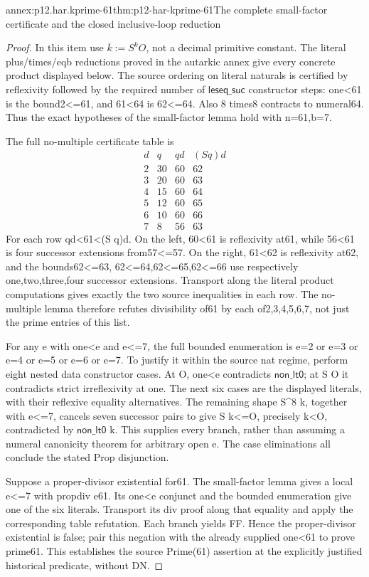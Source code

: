 \begin{annexitem}{annex:p12.har.kprime-61}{thm:p12-har-kprime-61}{The complete small-factor certificate and the closed inclusive-loop reduction}
\begin{proof}
In this item use \(\overline{k}:=S^kO\), not a decimal primitive
constant. The literal plus/times/eqb reductions proved in the autarkic
annex give every concrete product displayed below. The source ordering
on literal naturals is certified by reflexivity followed by the required
number of \(\mathsf{leseq\_suc}\) constructor steps: one<61 is the bound2<=61,
and 61<64 is 62<=64. Also 8 times8 contracts to numeral64.
Thus the exact hypotheses of the small-factor lemma hold with n=61,b=7.

The full no-multiple certificate table is
\[
\begin{array}{c|c|c|c}
 d&q&qd& (S q)d\\\hline
 2&30&60&62\\
 3&20&60&63\\
 4&15&60&64\\
 5&12&60&65\\
 6&10&60&66\\
 7&8&56&63
\end{array}
\]
For each row qd<61<(S q)d. On the left, 60<61 is reflexivity
at61, while 56<61 is four successor extensions from57<=57.
On the right, 61<62 is reflexivity at62, and the bounds62<=63,
62<=64,62<=65,62<=66 use respectively one,two,three,four successor
extensions. Transport along the literal product computations gives
exactly the two source inequalities in each row. The no-multiple
lemma therefore refutes divisibility of61 by each of2,3,4,5,6,7,
not just the prime entries of this list.

For any e with one<e and e<=7, the full bounded enumeration is
e=2 or e=3 or e=4 or e=5 or e=6 or e=7. To justify it within
the source nat regime, perform eight nested data constructor cases.
At O, one<e contradicts \(\mathsf{non\_lt0}\); at S O it contradicts strict
irreflexivity at one. The next six cases are the displayed literals,
with their reflexive equality alternatives. The remaining shape
S^8 k, together with e<=7, cancels seven successor pairs to give
S k<=O, precisely k<O, contradicted by \(\mathsf{non\_lt0}\) k. This supplies
every branch, rather than assuming a numeral canonicity theorem for
arbitrary open e. The case eliminations all conclude the stated Prop
disjunction.

Suppose a proper-divisor existential for61. The small-factor lemma
gives a local e<=7 with propdiv e61. Its one<e conjunct and the
bounded enumeration give one of the six literals. Transport its div
proof along that equality and apply the corresponding table refutation.
Each branch yields FF. Hence the proper-divisor existential is false;
pair this negation with the already supplied one<61 to prove prime61.
This establishes the source Prime(61) assertion at the explicitly
justified historical predicate, without DN.


\end{proof}
\end{annexitem}
